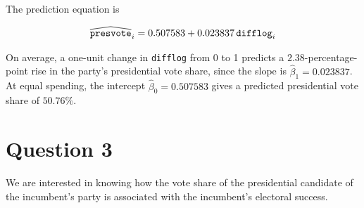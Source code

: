 \documentclass[12pt,letterpaper]{article}
\renewcommand{\widehat}[1]{\mathord{\tikz[baseline=(outcome.base)]{
  \node[inner sep=0pt,outer sep=0pt] (outcome) {$#1$};
  \draw[line width=.48pt,line join=round]
    ([yshift=1.1pt]outcome.north west) -- ([yshift=4pt]outcome.north) --
    ([yshift=1.1pt]outcome.north east);}}}
\begin{document}
\begin{enumerate}[(1)]
The prediction equation is

$$\widehat{\texttt{presvote}}_i=0.507583+0.023837\,\texttt{difflog}_i$$

On average, a one-unit change in \texttt{difflog} from 0 to 1 predicts a $2.38$-percentage-point rise in the party's presidential vote share, since the slope is $\hat{\beta}_1=0.023837$. At equal spending, the intercept $\hat{\beta}_0=0.507583$ gives a predicted presidential vote share of $50.76\%$.
\end{enumerate}

\newpage

\section{Question 3}
\noindent We are interested in knowing how the vote share of the presidential candidate of the incumbent's party is associated with the incumbent's electoral success.
\end{document}
